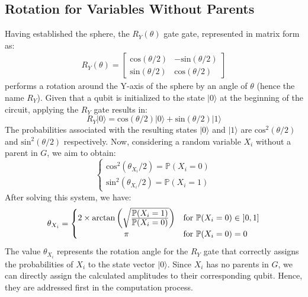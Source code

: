\subsection{Rotation for Variables Without Parents}
\label{simple_rotation_calc}
Having established the sphere, the $R_Y(\theta)$ gate gate, represented in matrix form as:
\begin{align*}
R_Y(\theta) = 
\begin{bmatrix}
\mathrm{cos}(\theta/2) & -\mathrm{sin}(\theta/2) \\
\mathrm{sin}(\theta/2) & \mathrm{cos}(\theta/2)
\end{bmatrix}
\end{align*}
performs a rotation around the Y-axis of the sphere by an angle of $\theta$ (hence the name $R_Y$). 
Given that a qubit is initialized to the state $|0\rangle$ at the beginning of the circuit, applying the $R_Y$ gate results in:
\[R_Y|0\rangle = \mathrm{cos}(\theta/2)|0\rangle+\mathrm{sin}(\theta/2)|1\rangle\]
The probabilities associated with the resulting states $|0\rangle$ and $|1\rangle$ are $\mathrm{cos}^2(\theta/2)$ and $\mathrm{sin}^2(\theta/2)$ respectively. Now, considering a random variable $X_i$ without a parent in $G$, we aim to obtain:
\[
\begin{cases}
\mathrm{cos}^2(\theta_{X_i}/2) = \mathbb{P}(X_i=0) \\
\mathrm{sin}^2(\theta_{X_i}/2) = \mathbb{P}(X_i=1)
\end{cases}
\]
After solving this system, we have:
\[
\theta_{X_i} = 
 \begin{cases}
 2\times\mathrm{arctan}\left(\sqrt{\frac{\displaystyle \mathbb{P}(X_i=1)}{\displaystyle \mathbb{P}(X_i=0)}}\right) & \mathrm{for} \ \mathbb{P}(X_i=0) \in \ ]0,1] \\
 \hfil \pi & \mathrm{for} \ \mathbb{P}(X_i=0)=0
 \end{cases}
\]
The value $\theta_{X_i}$ represents the rotation angle for the $R_Y$ gate that correctly assigns the probabilities of $X_i$ to the state vector $|0\rangle$. Since $X_i$ has no parents in $G$, we can directly assign the calculated amplitudes to their corresponding qubit. Hence, they are addressed first in the computation process.

